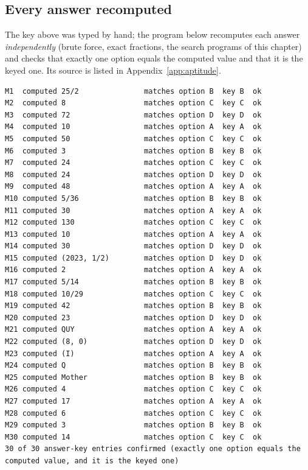 \documentclass[10pt,a4paper,openany,oneside]{report}
\begin{document}
\subsection*{Every answer recomputed}
\label{sec:mockcheck}
The key above was typed by hand; the program below recomputes each answer \emph{independently} (brute force, exact fractions, the search programs of this chapter) and checks that exactly one option equals the computed value and that it is the keyed one. Its source is listed in Appendix~\ref{app:aptitude}.

\begin{lstlisting}[style=out,basicstyle=\ttfamily\fontsize{7.2}{8.6}\selectfont,title={ap\_mock.py: output}]
M1  computed 25/2               matches option B  key B  ok
M2  computed 8                  matches option C  key C  ok
M3  computed 72                 matches option D  key D  ok
M4  computed 10                 matches option A  key A  ok
M5  computed 50                 matches option C  key C  ok
M6  computed 3                  matches option B  key B  ok
M7  computed 24                 matches option C  key C  ok
M8  computed 24                 matches option D  key D  ok
M9  computed 48                 matches option A  key A  ok
M10 computed 5/36               matches option B  key B  ok
M11 computed 30                 matches option A  key A  ok
M12 computed 130                matches option C  key C  ok
M13 computed 10                 matches option A  key A  ok
M14 computed 30                 matches option D  key D  ok
M15 computed (2023, 1/2)        matches option D  key D  ok
M16 computed 2                  matches option A  key A  ok
M17 computed 5/14               matches option B  key B  ok
M18 computed 10/29              matches option C  key C  ok
M19 computed 42                 matches option B  key B  ok
M20 computed 23                 matches option D  key D  ok
M21 computed QUY                matches option A  key A  ok
M22 computed (8, 0)             matches option D  key D  ok
M23 computed (I)                matches option A  key A  ok
M24 computed Q                  matches option B  key B  ok
M25 computed Mother             matches option B  key B  ok
M26 computed 4                  matches option C  key C  ok
M27 computed 17                 matches option A  key A  ok
M28 computed 6                  matches option C  key C  ok
M29 computed 3                  matches option B  key B  ok
M30 computed 14                 matches option C  key C  ok
30 of 30 answer-key entries confirmed (exactly one option equals the computed value, and it is the keyed one)
\end{lstlisting}
\end{document}
